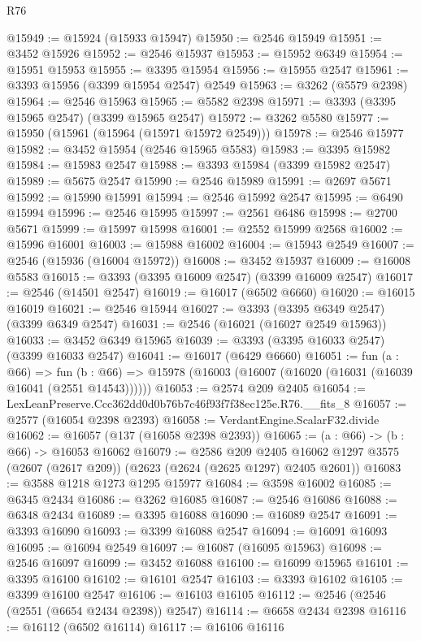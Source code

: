 \begin{lexlean}{R76}
\begin{coremodule}
@15949 := @15924 (@15933 @15947)
@15950 := @2546 @15949
@15951 := @3452 @15926
@15952 := @2546 @15937
@15953 := @15952 @6349
@15954 := @15951 @15953
@15955 := @3395 @15954
@15956 := @15955 @2547
@15961 := @3393 @15956 (@3399 @15954 @2547) @2549
@15963 := @3262 (@5579 @2398)
@15964 := @2546 @15963
@15965 := @5582 @2398
@15971 := @3393 (@3395 @15965 @2547) (@3399 @15965 @2547)
@15972 := @3262 @5580
@15977 := @15950 (@15961 (@15964 (@15971 @15972 @2549)))
@15978 := @2546 @15977
@15982 := @3452 @15954 (@2546 @15965 @5583)
@15983 := @3395 @15982
@15984 := @15983 @2547
@15988 := @3393 @15984 (@3399 @15982 @2547)
@15989 := @5675 @2547
@15990 := @2546 @15989
@15991 := @2697 @5671
@15992 := @15990 @15991
@15994 := @2546 @15992 @2547
@15995 := @6490 @15994
@15996 := @2546 @15995
@15997 := @2561 @6486
@15998 := @2700 @5671
@15999 := @15997 @15998
@16001 := @2552 @15999 @2568
@16002 := @15996 @16001
@16003 := @15988 @16002
@16004 := @15943 @2549
@16007 := @2546 (@15936 (@16004 @15972))
@16008 := @3452 @15937
@16009 := @16008 @5583
@16015 := @3393 (@3395 @16009 @2547) (@3399 @16009 @2547)
@16017 := @2546 (@14501 @2547)
@16019 := @16017 (@6502 @6660)
@16020 := @16015 @16019
@16021 := @2546 @15944
@16027 := @3393 (@3395 @6349 @2547) (@3399 @6349 @2547)
@16031 := @2546 (@16021 (@16027 @2549 @15963))
@16033 := @3452 @6349 @15965
@16039 := @3393 (@3395 @16033 @2547) (@3399 @16033 @2547)
@16041 := @16017 (@6429 @6660)
@16051 := fun (a : @66) =>
  fun (b : @66) => @15978 (@16003 (@16007 (@16020 (@16031 (@16039 @16041 (@2551 @14543))))))
@16053 := @2574 @209 @2405
@16054 := LexLeanPreserve.Ccc362dd0d0b76b7c46f93f7f38ec125e.R76.__fits_8
@16057 := @2577 (@16054 @2398 @2393)
@16058 := VerdantEngine.ScalarF32.divide
@16062 := @16057 (@137 (@16058 @2398 @2393))
@16065 := (a : @66) -> (b : @66) -> @16053 @16062
@16079 := @2586
    @209
    @2405
    @16062
    @1297
    @3575
    (@2607 (@2617 @209))
    (@2623 (@2624 (@2625 @1297) @2405 @2601))
@16083 := @3588 @1218 @1273 @1295 @15977
@16084 := @3598 @16002
@16085 := @6345 @2434
@16086 := @3262 @16085
@16087 := @2546 @16086
@16088 := @6348 @2434
@16089 := @3395 @16088
@16090 := @16089 @2547
@16091 := @3393 @16090
@16093 := @3399 @16088 @2547
@16094 := @16091 @16093
@16095 := @16094 @2549
@16097 := @16087 (@16095 @15963)
@16098 := @2546 @16097
@16099 := @3452 @16088
@16100 := @16099 @15965
@16101 := @3395 @16100
@16102 := @16101 @2547
@16103 := @3393 @16102
@16105 := @3399 @16100 @2547
@16106 := @16103 @16105
@16112 := @2546 (@2546 (@2551 (@6654 @2434 @2398)) @2547)
@16114 := @6658 @2434 @2398
@16116 := @16112 (@6502 @16114)
@16117 := @16106 @16116

\end{coremodule}
\end{lexlean}
